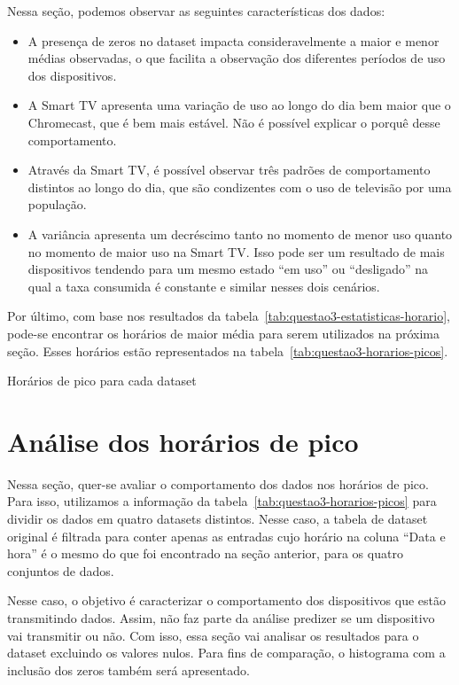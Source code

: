 \documentclass{article}
\begin{document}
Nessa seção, podemos observar as seguintes características dos dados:
\begin{itemize}
	\item A presença de zeros no dataset impacta consideravelmente a maior e menor médias observadas, o que facilita a observação dos diferentes períodos de uso dos dispositivos.
	\item A Smart TV apresenta uma variação de uso ao longo do dia bem maior que o Chromecast, que é bem mais estável. Não é possível explicar o porquê desse comportamento.
	\item Através da Smart TV, é possível observar três padrões de comportamento distintos ao longo do dia, que são condizentes com o uso de televisão por uma população.
	\item A variância apresenta um decréscimo tanto no momento de menor uso quanto no momento de maior uso na Smart TV. Isso pode ser um resultado de mais dispositivos tendendo para um mesmo estado ``em uso'' ou ``desligado'' na qual a taxa consumida é constante e similar nesses dois cenários.
\end{itemize}

Por último, com base nos resultados da tabela~\ref{tab:questao3-estatisticas-horario}, pode-se encontrar os horários de maior média para serem utilizados na próxima seção. Esses horários estão representados na tabela~\ref{tab:questao3-horarios-picos}.

\begin{table}[h]
	\centering
	
	\caption{Horários de pico para cada dataset}
	\label{tab:questao3-horarios-picos}
\end{table}

\section{Análise dos horários de pico}
\label{sec:analise-pico}

Nessa seção, quer-se avaliar o comportamento dos dados nos horários de pico. Para isso, utilizamos a informação da tabela~\ref{tab:questao3-horarios-picos} para dividir os dados em quatro datasets distintos. Nesse caso, a tabela de dataset original é filtrada para conter apenas as entradas cujo horário na coluna ``Data e hora'' é o mesmo do que foi encontrado na seção anterior, para os quatro conjuntos de dados.

Nesse caso, o objetivo é caracterizar o comportamento dos dispositivos que estão transmitindo dados. Assim, não faz parte da análise predizer se um dispositivo vai transmitir ou não. Com isso, essa seção vai analisar os resultados para o dataset excluindo os valores nulos. Para fins de comparação, o histograma com a inclusão dos zeros também será apresentado.
\end{document}
